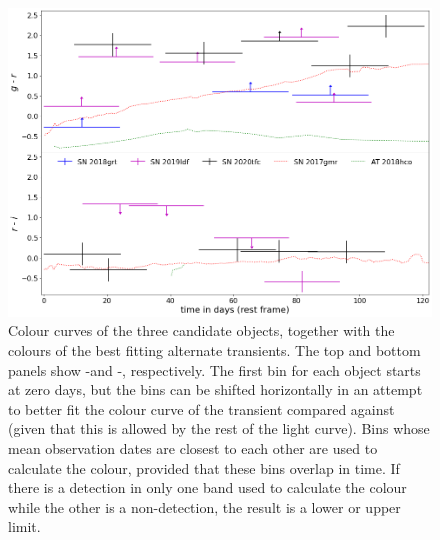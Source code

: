 \documentclass[a4paper,oneside,12pt, class=Latex/Classes/PhDthesisPSnPDF, crop=false]{standalone}
\begin{document}
\begin{figure}
 \centering
 \includegraphics[width=13cm]{../Images/chapter_3/candid_colours.png}
 \caption{Colour curves of the three candidate objects, together with the colours of the best fitting alternate transients. The top and bottom panels show \ztfg-\ztfr and \ztfr-\ztfi, respectively. The first bin for each object starts at zero days, but the bins can be shifted horizontally in an attempt to better fit the colour curve of the transient compared against (given that this is allowed by the rest of the light curve). Bins whose mean observation dates are closest to each other are used to calculate the colour, provided that these bins overlap in time. If there is a detection in only one band used to calculate the colour while the other is a non-detection, the result is a lower or upper limit.}
 \label{candidate_colours}
\end{figure}
\end{document}
